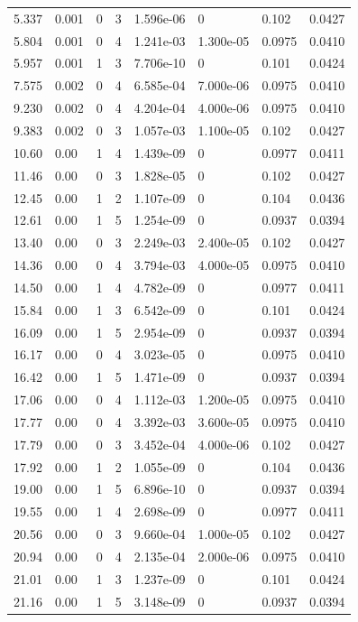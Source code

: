 \documentclass[preview]{standalone}
\begin{document}
{{\begin{tabular}{L{1.2cm}C{1.2cm} C{0.3cm}C{0.5cm} C{1.4cm}C{1.4cm} C{1.4cm}C{1.4cm}}
  5.337  &  0.001  & 0     &  3 &  1.596e-06  & 0  & 0.102 &  0.0427   \\ 
  5.804  &  0.001  & 0     &  4 &  1.241e-03  & 1.300e-05  & 0.0975 &  0.0410   \\ 
  5.957  &  0.001  & 1     &  3 &  7.706e-10  & 0  & 0.101 &  0.0424   \\ 
  7.575  &  0.002  & 0     &  4 &  6.585e-04  & 7.000e-06  & 0.0975 &  0.0410   \\ 
  9.230  &  0.002  & 0     &  4 &  4.204e-04  & 4.000e-06  & 0.0975 &  0.0410   \\ 
  9.383  &  0.002  & 0     &  3 &  1.057e-03  & 1.100e-05  & 0.102 &  0.0427   \\ 
  10.60  &  0.00  & 1     &  4 &  1.439e-09  & 0  & 0.0977 &  0.0411   \\ 
  11.46  &  0.00  & 0     &  3 &  1.828e-05  & 0  & 0.102 &  0.0427   \\ 
  12.45  &  0.00  & 1     &  2 &  1.107e-09  & 0  & 0.104 &  0.0436   \\ 
  12.61  &  0.00  & 1     &  5 &  1.254e-09  & 0  & 0.0937 &  0.0394   \\ 
  13.40  &  0.00  & 0     &  3 &  2.249e-03  & 2.400e-05  & 0.102 &  0.0427   \\ 
  14.36  &  0.00  & 0     &  4 &  3.794e-03  & 4.000e-05  & 0.0975 &  0.0410   \\ 
  14.50  &  0.00  & 1     &  4 &  4.782e-09  & 0  & 0.0977 &  0.0411   \\ 
  15.84  &  0.00  & 1     &  3 &  6.542e-09  & 0  & 0.101 &  0.0424   \\ 
  16.09  &  0.00  & 1     &  5 &  2.954e-09  & 0  & 0.0937 &  0.0394   \\ 
  16.17  &  0.00  & 0     &  4 &  3.023e-05  & 0  & 0.0975 &  0.0410   \\ 
  16.42  &  0.00  & 1     &  5 &  1.471e-09  & 0  & 0.0937 &  0.0394   \\ 
  17.06  &  0.00  & 0     &  4 &  1.112e-03  & 1.200e-05  & 0.0975 &  0.0410   \\ 
  17.77  &  0.00  & 0     &  4 &  3.392e-03  & 3.600e-05  & 0.0975 &  0.0410   \\ 
  17.79  &  0.00  & 0     &  3 &  3.452e-04  & 4.000e-06  & 0.102 &  0.0427   \\ 
  17.92  &  0.00  & 1     &  2 &  1.055e-09  & 0  & 0.104 &  0.0436   \\ 
  19.00  &  0.00  & 1     &  5 &  6.896e-10  & 0  & 0.0937 &  0.0394   \\ 
  19.55  &  0.00  & 1     &  4 &  2.698e-09  & 0  & 0.0977 &  0.0411   \\ 
  20.56  &  0.00  & 0     &  3 &  9.660e-04  & 1.000e-05  & 0.102 &  0.0427   \\ 
  20.94  &  0.00  & 0     &  4 &  2.135e-04  & 2.000e-06  & 0.0975 &  0.0410   \\ 
  21.01  &  0.00  & 1     &  3 &  1.237e-09  & 0  & 0.101 &  0.0424   \\ 
  21.16  &  0.00  & 1     &  5 &  3.148e-09  & 0  & 0.0937 &  0.0394   \\ 
\hline 
\end{tabular} 

}}
\end{document}
